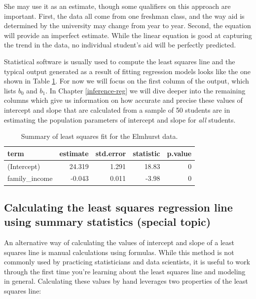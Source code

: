 \documentclass[
  10pt,
  openany]{book}
\theoremstyle{definition}
\theoremstyle{definition}
\theoremstyle{definition}
\theoremstyle{definition}
\theoremstyle{remark}
\begin{document}
She may use it as an estimate, though some qualifiers on this approach are important.
First, the data all come from one freshman class, and the way aid is determined by the university may change from year to year.
Second, the equation will provide an imperfect estimate.
While the linear equation is good at capturing the trend in the data, no individual student's aid will be perfectly predicted.

Statistical software is usually used to compute the least squares line and the typical output generated as a result of fitting regression models looks like the one shown in Table \ref{tab:rOutputForIncomeAidLSRLine}.
For now we will focus on the first column of the output, which lists \({b}_0\) and \({b}_1\).
In Chapter \ref{inference-reg} we will dive deeper into the remaining columns which give us information on how accurate and precise these values of intercept and slope that are calculated from a sample of 50 students are in estimating the population parameters of intercept and slope for \emph{all} students.

\begin{table}
\centering
\caption{\label{tab:rOutputForIncomeAidLSRLine}Summary of least squares fit for the Elmhurst data.}
\centering
\begin{tabular}[t]{l|r|r|r|r}
\hline
term & estimate & std.error & statistic & p.value\\
\hline
(Intercept) & 24.319 & 1.291 & 18.83 & 0\\
\hline
family\_income & -0.043 & 0.011 & -3.98 & 0\\
\hline
\end{tabular}
\end{table}

\subsection{Calculating the least squares regression line using summary statistics (special topic)}\label{calculating-the-least-squares-regression-line-using-summary-statistics-special-topic}

An alternative way of calculating the values of intercept and slope of a least squares line is manual calculations using formulas.
While this method is not commonly used by practicing statisticians and data scientists, it is useful to work through the first time you're learning about the least squares line and modeling in general.
Calculating these values by hand leverages two properties of the least squares line:
\end{document}
